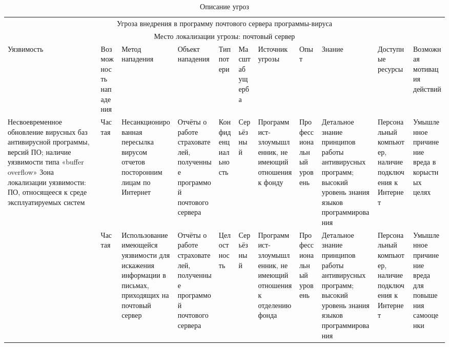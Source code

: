\label{AppendixB}

\begin{sidewaystable}[h]
\small
  \begin{longtable}{|p{2.5cm}|p{1.5cm}|p{2cm}|p{2cm}|p{1.5cm}|p{1.5cm}|p{1.5cm}|p{1.5cm}|p{3cm}|p{2cm}|p{2cm}|}
    \caption{Описание угроз}
    \label{tab:appb} \\
    \hline
    \multicolumn{11}{|c|}{Угроза внедрения в программу почтового сервера программы-вируса}\\
    \multicolumn{11}{|c|}{Место локализации угрозы: почтовый сервер}\\\hline
    Уязвимость & Возмож\-ность нападения & Метод нападения & Объект
    нападения & Тип потери & Масш\-таб ущерба & Источник угрозы & Опыт &
    Знание & Доступные ресурсы & Возможная мотивация действий\\\hline
    \multirow{2}{3cm}{Несвоевре\-менное обновление вирусных баз антивирусной программы,
    версий ПО; наличие уязвимости типа «buffer overflow»
    Зона локализации уязвимости: ПО, относящееся к среде
    эксплуатируемых систем} & Частая & Несанк\-циони\-рован\-ная пересылка
  вирусом отчетов посторонним лицам по Интернет  &  Отчёты о работе страхователей,
  полученные программой почтового сервера & Конфи\-ден\-циаль\-ность & Серь\-ёз\-ный &
  Програм\-мист-зло\-умыш\-лен\-ник, не имеющий отношения к фонду & Профес\-сиональ\-ный уровень
  & Деталь\-ное знание принципов работы антивирусных программ; высокий
  уровень знания языков программирования & Персональ\-ный компьютер,
  наличие подключения к Интернет & Умышлен\-ное причинение вреда в
  корыстных целях\\\cline{2-11}
  & Частая & Исполь\-зова\-ние имеющейся уязвимости для искажения информации в
  письмах, приходящих на почтовый сервер & Отчёты о работе
  страхователей, полученные программой почтового сервера & Целос\-тность
  & Серьё\-зный & Програм\-мист-злоу\-мышлен\-ник, не имеющий отношения к
  отделению фонда & Профес\-сиональ\-ный уровень & Детальное знание
  принципов работы антивирусных программ; высокий уровень знания
  языков программирования & Персональ\-ный компьютер, наличие
  подключения к Интернет & Умыш\-лен\-ное причинение вреда для повышения
  самооценки \\\hline
  \end{longtable}
\end{sidewaystable}
\newpage


